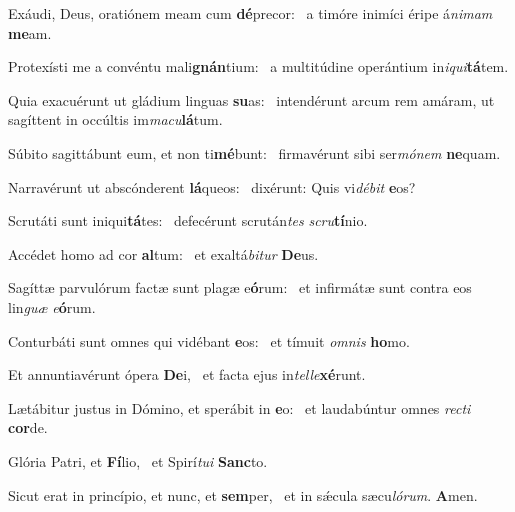\item Exáudi, Deus, oratiónem meam cum \textbf{dé}precor:~\psstar{} a timóre inimíci éripe á\textit{nimam} \textbf{me}am.
\item Protexísti me a convéntu mali\textbf{gnán}tium:~\psstar{} a multitúdine operántium in\textit{iqui}\textbf{tá}tem.
\item Quia exacuérunt ut gládium linguas \textbf{su}as:~\psstar{} intendérunt arcum rem amáram, ut sagíttent in occúltis im\textit{macu}\textbf{lá}tum.
\item Súbito sagittábunt eum, et non ti\textbf{mé}bunt:~\psstar{} firmavérunt sibi ser\textit{mónem} \textbf{ne}quam.
\item Narravérunt ut abscónderent \textbf{lá}queos:~\psstar{} dixérunt: Quis vi\textit{débit} \textbf{e}os?
\item Scrutáti sunt iniqui\textbf{tá}tes:~\psstar{} defecérunt scrután\textit{tes} \textit{scru}\textbf{tí}nio.
\item Accédet homo ad cor \textbf{al}tum:~\psstar{} et exaltá\textit{bitur} \textbf{De}us.
\item Sagíttæ parvulórum factæ sunt plagæ e\textbf{ó}rum:~\psstar{} et infirmátæ sunt contra eos lin\textit{guæ} \textit{e}\textbf{ó}rum.
\item Conturbáti sunt omnes qui vidébant \textbf{e}os:~\psstar{} et tímuit \textit{omnis} \textbf{ho}mo.
\item Et annuntiavérunt ópera \textbf{De}i,~\psstar{} et facta ejus in\textit{telle}\textbf{xé}runt.
\item Lætábitur justus in Dómino, et sperábit in \textbf{e}o:~\psstar{} et laudabúntur omnes \textit{recti} \textbf{cor}de.
\item Glória Patri, et \textbf{Fí}lio,~\psstar{} et Spirí\textit{tui} \textbf{Sanc}to.
\item Sicut erat in princípio, et nunc, et \textbf{sem}per,~\psstar{} et in sǽcula sæcu\textit{lórum}. \textbf{A}men.
